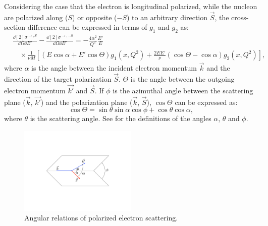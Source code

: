 Considering the case that the electron is longitudinal polarized, while the nucleon are polarized along ($S$) or opposite ($-S$) to an arbitrary direction $\vec{S}$, the cross-section difference can be expressed in terms of $g_1$ and $g_2$ as:
\begin{equation} \label{C2S2E23}
\begin{split}
& \frac{\dd[2]{\sigma}^{\rightarrow,S}}{\dd{\Omega}\dd{E'}}-\frac{\dd[2]{\sigma}^{\rightarrow,-S}}{\dd{\Omega}\dd{E'}} = -\frac{4\alpha^2}{Q^2}\frac{E'}{E} \\
& \quad \times\frac{1}{\nu M}\left[(E\cos\alpha+E'\cos\Theta)g_1(x,Q^2)+\frac{2EE'}{\nu}(\cos\Theta-\cos\alpha)g_2(x,Q^2)\right],
\end{split}
\end{equation}
where $\alpha$ is the angle between the incident electron momentum $\vec{k}$ and the direction of the target polarization $\vec{S}$. $\Theta$ is the angle between the outgoing electron momentum $\vec{k'}$ and $\vec{S}$. If $\phi$ is the azimuthal angle between the scattering plane ($\vec{k}$, $\vec{k'}$) and the polarization plane ($\vec{k}$, $\vec{S}$), $\cos\Theta$ can be expressed as:
\begin{equation} \label{C2S2E24}
\cos\Theta = \sin\theta\sin\alpha\cos\phi+\cos\theta\cos\alpha,
\end{equation}
where $\theta$ is the scattering angle. See  for the definitions of the angles $\alpha$, $\theta$ and $\phi$.

\begin{figure}[tb!]
  \centering
  \includegraphics[width=0.5\textwidth]{figs/angles-of-polarized-scattering.pdf}
  \caption[Angular relations of polarized electron scattering.]{Angular relations of polarized electron scattering. \label{C2S2F1}}
\end{figure}

